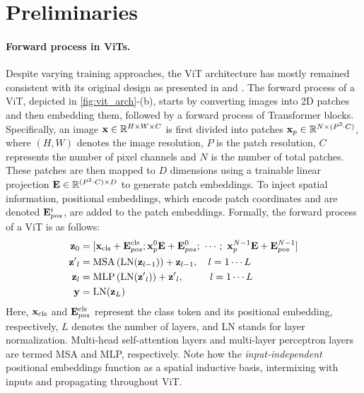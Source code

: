 \section{Preliminaries}
\label{sec:background}

\paragraph{Forward process in ViTs.} Despite varying training approaches, the ViT architecture has mostly remained consistent with its original design as presented in \cite{dosovitskiy2021image} and \cite{vaswani2023attention}. The forward process of a ViT, depicted in \cref{fig:vit_arch}-(b), starts by converting images into 2D patches and then embedding them, followed by a forward process of Transformer blocks. Specifically, an image $\vb{x} \in \mathbb{R}^{H\times W \times C}$ is first divided into patches $\vb{x}_{p} \in \mathbb{R}^{N\times (P^2 \cdot C)}$, where $(H, W)$ denotes the image resolution, $P$ is the patch resolution, $C$ represents the number of pixel channels and $N$ is the number of total patches. These patches are then mapped to $D$ dimensions using a trainable linear projection $\vb{E} \in {\mathbb{R}^{(P^2 \cdot C)\times D}}$ to generate patch embeddings. To inject spatial information, positional embeddings, which encode patch coordinates and are denoted $\vb{E}_{pos}^{i}$, are added to the patch embeddings. Formally, the forward process of a ViT is as follows:
\begin{align}
    \vb{z}_0  & = [ \vb{x}_{\text{cls}} + \vb{E}_{pos}^{\text{cls}} ; \vb{x}_p^0\vb{E} + \vb{E}_{pos}^{0} ; ~\cdots ; ~\vb{x}_p^{N-1}\vb{E} + \vb{E}_{pos}^{N-1}]  \label{eq1} \\
    \vb{z'}_l & =\text{MSA}\left( \text{LN} (\vb{z}_{l-1}) \right) + \vb{z}_{l-1}, \quad l= 1 \cdots L \label{eq2}                                                             \\
    \vb{z}_l  & =\text{MLP}\left( \text{LN} (\vb{z'}_{l}) \right) + \vb{z'}_{l}, \quad\quad ~~l= 1 \cdots L \label{eq3}                                                        \\
    \vb{y}    & = \text{LN} (\vb{z}_{L}) \label{eq4}
\end{align}
Here, $\vb{x}_{\text{cls}}$ and $\vb{E}_{pos}^{\text{cls}}$ represent the class token and its positional embedding, respectively, $L$ denotes the number of layers, and LN stands for layer normalization. Multi-head self-attention layers and multi-layer perceptron layers are termed MSA and MLP, respectively. Note how the \textit{input-independent} positional embeddings function as a spatial inductive basis, intermixing with inputs and propagating throughout ViT.




